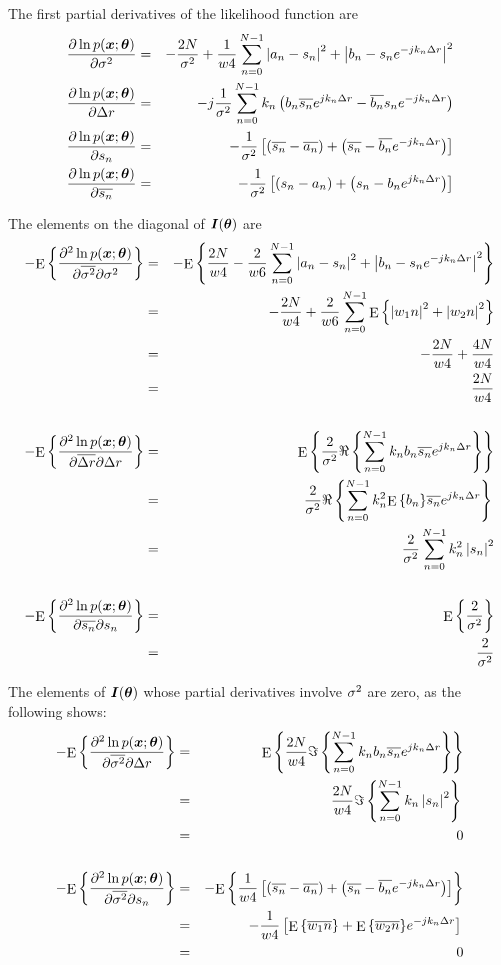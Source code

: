 The first partial derivatives of the likelihood function are
\begin{eqnarray}
\FPD{\nv}&=&-\frac{2N}{\nv}+\frac{1}{\np{4}}\sum_{n=0}^{N-1}
\left|a_n-s_n\right|^2+\left|b_n-s_n\e{-jk_n\dr}\right|^2 \\
\FPD{\dr}&=&-j\frac{1}{\nv}\sum_{n=0}^{N-1}k_n\left( 
b_n\conj{s_n}\e{jk_n\dr}-\conj{b_n}s_n\e{-jk_n\dr}\right) \\
\FPD{s_n}&=&-\frac{1}{\nv}\left[\left(\conj{s_n}-\conj{a_n}\right)
+\left(\conj{s_n}-\conj{b_n}\e{-jk_n\dr}\right)\right] \\
\FPD{\conj{s_n}}&=&-\frac{1}{\nv}\left[\left(s_n-a_n\right)
+\left(s_n-b_n\e{jk_n\dr}\right)\right] 
\end{eqnarray}

The elements on the diagonal of $\infmat{\uvp}$ are
\begin{eqnarray}
\FIM{\nv}{\nv}&=&-\E{\frac{2N}{\np{4}}-\frac{2}{\np{6}}\sum_{n=0}^{N-1}
\left|a_n-s_n\right|^2+\left|b_n-s_n\e{-jk_n\dr}\right|^2}  \nn\\
&=&-\frac{2N}{\np{4}}+\frac{2}{\np{6}}\sum_{n=0}^{N-1}\E{
\left|\na{n}\right|^2+\left|\nb{n}\right|^2}  \nn\\
&=&-\frac{2N}{\np{4}}+\frac{4N}{\np{4}} \nn\\
&=&\frac{2N}{\np{4}} \\
&&\nn\\
\FIM{\dr}{\dr}&=&\E{\frac{2}{\nv}\real{\sum_{n=0}^{N-1}
k_nb_n\conj{s_n}\e{jk_n\dr}}}  \nn\\
&=&\frac{2}{\nv}\real{\sum_{n=0}^{N-1}k_n^2\E{b_n}\conj{s_n}\e{jk_n\dr}} \nn\\
&=&\frac{2}{\nv}\sum_{n=0}^{N-1}k_n^2\left|s_n\right|^2 \\
&&\nn\\
\FIM{s_n}{s_n}&=&\E{\frac{2}{\nv}}\nn\\
&=&\frac{2}{\nv} 
\end{eqnarray}

The elements of $\infmat{\uvp}$ whose partial derivatives involve $\nv$ are
zero, as the following shows:
\begin{eqnarray}
\FIM{\nv}{\dr}&=&\E{\frac{2N}{\np{4}}\imag{
\sum_{n=0}^{N-1} k_nb_n\conj{s_n}\e{jk_n\dr}}}  \nn\\
&=&\frac{2N}{\np{4}}\imag{\sum_{n=0}^{N-1} k_n\left|s_n\right|^2}  \nn\\
&=&0 \\
&&\nn\\
\FIM{\nv}{s_n}&=&-\E{\frac{1}{\np{4}}\left[\left(\conj{s_n}-\conj{a_n}\right)
+\left(\conj{s_n}-\conj{b_n}\e{-jk_n\dr}\right)\right]} \nn\\
&=&-\frac{1}{\np{4}}\left[\E{\conj{\na{n}}}+\E{\conj{\nb{n}}}\e{-jk_n\dr}
\right] \nn\\
&=&0
\end{eqnarray}

